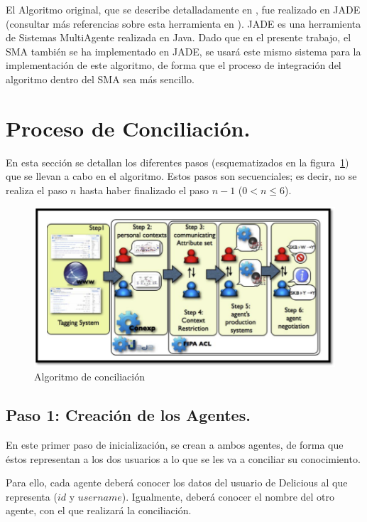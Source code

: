 El Algoritmo original, que se describe detalladamente en \cite{algoritmo}, fue realizado en JADE (consultar más referencias sobre esta herramienta en \cite{jade}). JADE es una herramienta de Sistemas MultiAgente realizada en Java. Dado que en el presente trabajo, el SMA también se ha implementado en JADE, se usará este mismo sistema para la implementación de este algoritmo, de forma que el proceso de integración del algoritmo dentro del SMA sea más sencillo.






\section{Proceso de Conciliación.}

En esta sección se detallan los diferentes pasos (esquematizados en la figura~\ref{fig:algoritmo}) que se llevan a cabo en el algoritmo. Estos pasos son secuenciales; es decir, no se realiza el paso $n$ hasta haber finalizado el paso $n-1$ ($0< n \leq 6$).

\begin{figure}[t]
\centering
\includegraphics[scale=0.8]{img/4/algoritmo}
\caption{Algoritmo de conciliación
\label{fig:algoritmo}}
\end{figure}


\subsection{Paso 1: Creación de los Agentes.}

En este primer paso de inicialización, se crean a ambos agentes, de forma que éstos representan a los dos usuarios a lo que se les va a conciliar su conocimiento.

Para ello, cada agente deberá conocer los datos del usuario de Delicious al que representa ($id$ y $username$). Igualmente, deberá conocer el nombre del otro agente, con el que realizará la conciliación.

